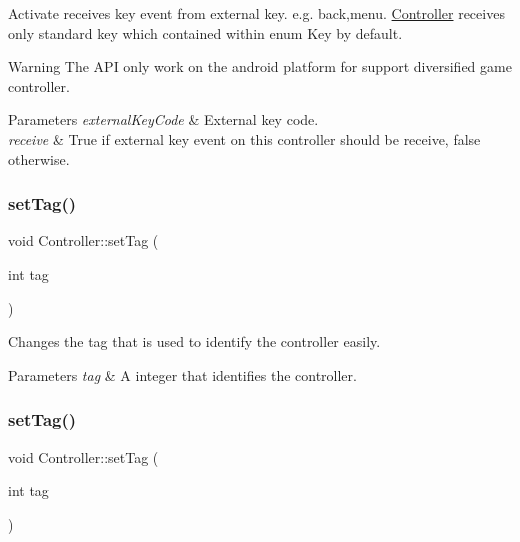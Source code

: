 Activate receives key event from external key. e.\+g. back,menu. \hyperlink{classController}{Controller} receives only standard key which contained within enum Key by default.

\begin{DoxyWarning}{Warning}
The A\+PI only work on the android platform for support diversified game controller.
\end{DoxyWarning}

\begin{DoxyParams}{Parameters}
{\em external\+Key\+Code} & External key code. \\
\hline
{\em receive} & True if external key event on this controller should be receive, false otherwise. \\
\hline
\end{DoxyParams}
\mbox{\label{classController_a0995ba881e0a6ee1b71a2fd366dcad90}} 
\subsubsection{\texorpdfstring{set\+Tag()}{setTag()}\hspace{0.1cm}{\footnotesize\ttfamily [1/2]}}
{\footnotesize\ttfamily void Controller\+::set\+Tag (\begin{DoxyParamCaption}\item[{int}]{tag }\end{DoxyParamCaption})\hspace{0.3cm}{\ttfamily [inline]}}

Changes the tag that is used to identify the controller easily. 
\begin{DoxyParams}{Parameters}
{\em tag} & A integer that identifies the controller. \\
\hline
\end{DoxyParams}
\mbox{\label{classController_a0995ba881e0a6ee1b71a2fd366dcad90}} 
\subsubsection{\texorpdfstring{set\+Tag()}{setTag()}\hspace{0.1cm}{\footnotesize\ttfamily [2/2]}}
{\footnotesize\ttfamily void Controller\+::set\+Tag (\begin{DoxyParamCaption}\item[{int}]{tag }\end{DoxyParamCaption})\hspace{0.3cm}{\ttfamily [inline]}}

